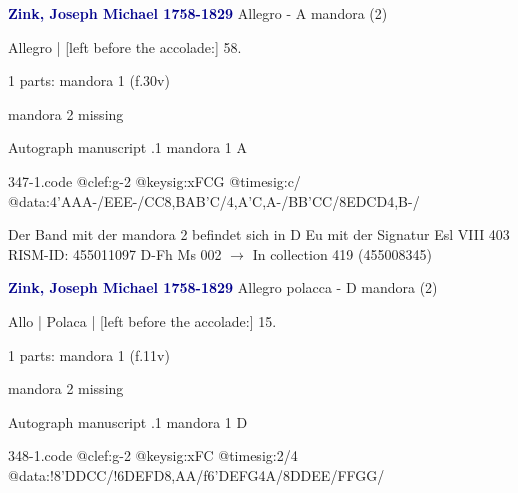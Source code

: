 \documentclass[twocolumn]{book}
\begin{document}
\newline \par \vspace{7pt} \textcolor{darkblue}{\textbf{Zink, Joseph Michael  1758-1829}}
\newline Allegro - A
\newline mandora (2)
\newline \begin{itshape}[f.30v, at left:] Allegro | [left before the accolade:] 58.\end{itshape} 
\newline \textcolor{darkblue}{}  1 parts: mandora 1  (f.30v)
\newline \begin{small} mandora 2 missing\end{small} 
\newline Autograph manuscript
.1  mandora 1  A  
\begin{filecontents*}{347-1.code}
@clef:g-2
@keysig:xFCG
@timesig:c/
@data:4'AAA-/EEE-/CC8,BAB'C/4,A'C,A-/BB'CC/8EDCD4,B-/
\end{filecontents*}
\newline
%

\newline Der Band mit der mandora 2 befindet sich in D Eu mit der Signatur Esl VIII 403
\newline RISM-ID: 455011097
\newline D-Fh  Ms 002
\newline $\rightarrow$ In collection 419 (455008345)
      
\newline \par \vspace{7pt} \textcolor{darkblue}{\textbf{Zink, Joseph Michael  1758-1829}}
\newline Allegro polacca - D
\newline mandora (2)
\newline \begin{itshape}[f.11v, at left:] Allo | Polaca | [left before the accolade:] 15.\end{itshape} 
\newline \textcolor{darkblue}{}  1 parts: mandora 1  (f.11v)
\newline \begin{small} mandora 2 missing\end{small} 
\newline Autograph manuscript
.1  mandora 1  D  
\begin{filecontents*}{348-1.code}
@clef:g-2
@keysig:xFC
@timesig:2/4
@data:!8'DDCC/!6DEFD{8,AA}/f6'DEFG4A/8DDEE/FFGG/
\end{filecontents*}
\newline
%
\end{document}
